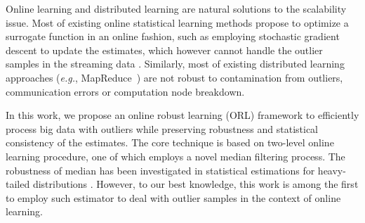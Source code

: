 \documentclass[11pt]{article}
\begin{document}
Online learning and distributed learning are natural solutions to the scalability issue. Most of existing online statistical learning methods propose to optimize a surrogate function in an online fashion, such as employing stochastic gradient descent \cite{guan2012online,mairal2009online,feng2013online} to update the estimates, which however cannot handle the outlier samples in the streaming data \cite{huber2011robust}.   
Similarly, most of existing distributed learning approaches (\emph{e.g.}, MapReduce~\cite{dean2008mapreduce}) are not robust to  contamination from outliers, communication errors or computation node breakdown. %



In this work, we propose an online robust learning (ORL)  framework to efficiently process big data with outliers while preserving robustness and statistical consistency of the estimates. The core technique is based on two-level online learning procedure, one of which employs a novel  median filtering process. The robustness of median has been  investigated in statistical estimations for heavy-tailed distributions \cite{minsker2013geometric,hsu2013loss}. However, to our best knowledge, this work is among the first to  employ such estimator to deal with outlier samples in the context of online learning.
\end{document}

